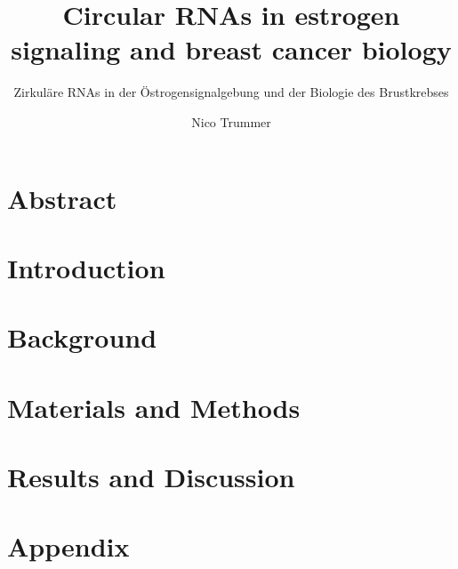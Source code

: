 \documentclass[
  a4paper,            %
  english,            %
]{tumbook}
\title{Circular RNAs in estrogen signaling and breast cancer biology}
\subtitle{Zirkuläre RNAs in der Östrogensignalgebung und der Biologie des Brustkrebses}
\author{Nico Trummer}
\begin{document}
\setcounter{tocdepth}{4}

\frontmatter
\maketitle
\chapter{Abstract}

\tableofcontents

\mainmatter
\chapter{Introduction}


\chapter{Background}


\chapter{Materials and Methods}


\chapter{Results and Discussion}


\appendix
\chapter{Appendix}
\lipsum[4]

% 

\printbibliography
\end{document}
